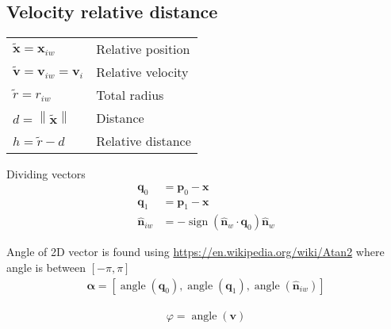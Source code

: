 \subsection{Velocity relative distance}

\begin{table}[H]
\centering
\begin{tabular}{ll}
$ \tilde{\mathbf{x}} = \mathbf{x}_{iw} $ & Relative position \\
$ \tilde{\mathbf{v}} = \mathbf{v}_{iw} = \mathbf{v}_{i} $ & Relative velocity \\
$ \tilde{r} = r_{iw} $ & Total radius \\
$ d = \left\|\tilde{\mathbf{x}}\right\| $ & Distance\\
$ h = \tilde{r} - d $ & Relative distance \\
\end{tabular}
\end{table}

Dividing vectors
\begin{align}
\mathbf{q}_{0} &= \mathbf{p}_{0} - \mathbf{x} \\
\mathbf{q}_{1} &= \mathbf{p}_{1} - \mathbf{x} \\
\hat{\mathbf{n}}_{iw} &= - \operatorname{sign}(\hat{\mathbf{n}}_{w} \cdot \mathbf{q}_{0}) \hat{\mathbf{n}}_{w}
\end{align}

Angle of 2D vector is found using \url{https://en.wikipedia.org/wiki/Atan2} where angle is between $ [-\pi, \pi] $
\newcommand{\atan}{\ensuremath{\operatorname{angle}}}
\begin{align}
\boldsymbol{\alpha} = [\atan(\mathbf{q}_{0}), \atan(\mathbf{q}_{1}), \atan(\hat{\mathbf{n}}_{iw})]
\end{align}

\begin{align}
\varphi = \atan(\mathbf{v})
\end{align}

